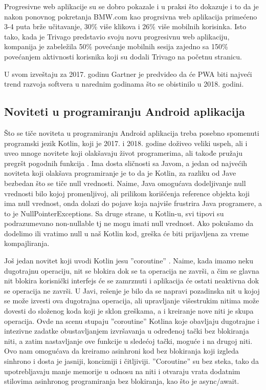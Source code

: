 \documentclass[a4paper]{article}
\begin{document}
Progresivne web aplikacije su se dobro pokazale i u praksi što dokazuje i to da je nakon ponovnog pokretanja BMW.com kao progrsivna web aplikacija primećeno 3-4 puta brže učitavanje, 30\% više klikova i 26\% više mobilnih korisinka. Isto tako, kada je Trivago predstavio svoju novu progresivnu web aplikaciju, kompanija je zabeležila 50\% povećanje mobilnih sesija zajedno sa 150\% povećanjem aktivnosti korisnika koji su dodali Trivago na početnu stranicu. 

U svom izveštaju za 2017. godinu Gartner je predvideo da će PWA biti najveći trend razvoja softvera u narednim godinama što se obistinilo u 2018. godini.

\subsection{Noviteti u programiranju Android aplikacija}
\label{subsec:noviteti u programiranju Andriod aplikacija}

Što se tiče noviteta u programiranju Android aplikacija treba posebno spomenuti programski jezik Kotlin, koji je 2017. i 2018. godine doživeo veliki uspeh, ali i uveo mnoge novitete koji olakšavaju život programerima, ali takođe pružaju pregršt pogodnih funkcija \cite{kotlin}. Ima dosta sličnosti sa Javom, a jedan od najvećih noviteta koji olakšava programiranje je to da je Kotlin, za razliku od Jave bezbedan što se tiče null vrednosti. Naime, Java omogućava dodeljivanje null vrednosti bilo kojoj promenljivoj, ali prilikom korišćenja reference objekta koji ima null vrednost, onda dolazi do pojave koja najviše frustrira Java programere, a to je NullPointerExceptions. Sa druge strane, u Kotlin-u, svi tipovi su podrazumevano non-nullable tj ne mogu imati null vrednost. Ako pokušamo da dodelimo ili vratimo null u naš Kotlin kod, greška će biti prijavljena za vreme kompajliranja.

Još jedan novitet koji uvodi Kotlin jesu ''coroutine'' \cite{coroutine}. Naime, kada imamo neku dugotrajnu operaciju, nit se blokira dok se ta operacija ne završi, a čim se glavna nit blokira korisnički interfejs će se zamrznuti i aplikacija će ostati neaktivna dok se operacija ne završi. U Javi, rešenje je bilo da se napravi pozadinska nit u kojoj se može izvesti ova dugotrajna operacija, ali upravljanje višestrukim nitima može dovesti do složenog koda koji je sklon greškama, a i kreiranje nove niti je skupa operacija. Ovde na scenu stupaju ''coroutine'' Kotlina koje obavljaju dugotrajne i intezivne zadatke obustavljanjem izvršavanja u određenoj tački bez blokiranja niti, a zatim nastavljanje ove funkcije u sledećoj tački, moguće i na drugoj niti. Ovo nam omogućava da kreiramo asinhroni kod bez blokiranja koji izgleda sinhrono i dosta je jasniji, koncizniji i čitljiviji. ''Coroutine'' su bez steka, tako da upotrebljavaju manje memorije u odnosu na niti i otvaraju vrata dodatnim stilovima asinhronog programiranja bez blokiranja, kao što je async/await.
\end{document}
